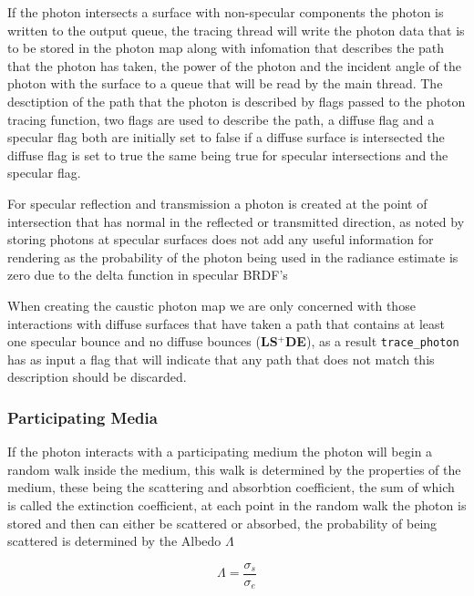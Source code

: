 If the photon intersects a surface with non-specular components the photon is written to the output queue, 
the tracing thread will write the photon data that is to be stored in
the photon map along with infomation that describes the path that the photon has taken, the power of the photon and the
incident angle of the photon with the surface to a queue that will be read by the main thread.
The desctiption of the path that the photon is described by flags passed to the photon tracing function,
two flags are used to describe the path, a diffuse flag and a specular flag both are initially set to false if a diffuse
surface is intersected the diffuse flag is set to true the same being true for specular intersections and the specular flag.

For specular reflection and transmission a photon is created at the point of intersection that has normal in the reflected
or transmitted direction, as noted by  storing photons at specular surfaces does not add any useful
information for rendering as the probability of the photon being used in the radiance estimate is zero due to the
delta function in specular BRDF's

When creating the caustic photon map we are only concerned with those interactions with diffuse surfaces that have
taken a path that contains at least one specular bounce and no diffuse bounces (\textbf{LS$^+$DE}), as a result \texttt{trace\_photon}
has as input a flag that will indicate that any path that does not match this description should be discarded.

\subsubsection{Participating Media}
If the photon interacts with a participating medium the photon will begin a random walk inside the medium, this walk
is determined by the properties of the medium, these being the scattering and absorbtion coefficient, the sum of which
is called the extinction coefficient, at each point in the random walk the photon is stored and then can either be
scattered or absorbed, the probability of being scattered is determined by the Albedo $\Lambda$


\begin{equation}
\Lambda = \frac{\sigma_s}{\sigma_e}
\end{equation}

